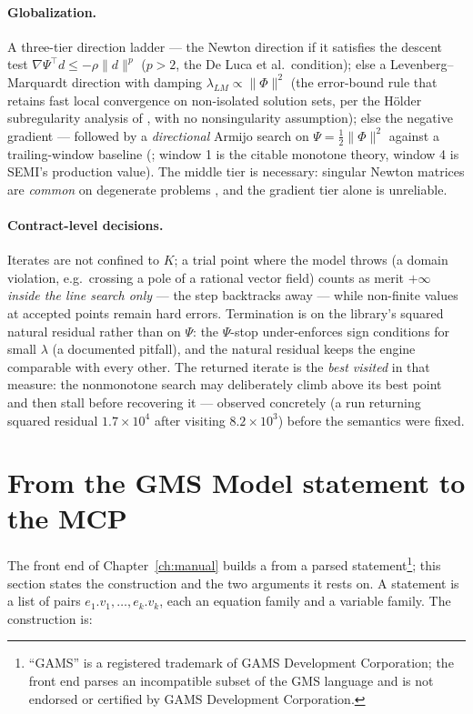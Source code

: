 \paragraph{Globalization.} A three-tier direction ladder --- the Newton
direction if it satisfies the descent test
$\nabla\Psi^\top d \le -\rho\|d\|^{p}$ ($p > 2$, the De Luca et al.\
condition); else a Levenberg--Marquardt direction with damping
$\lambda_{LM} \propto \|\Phi\|^2$ (the error-bound rule that retains fast
local convergence on non-isolated solution sets, per the H\"older
subregularity analysis of \cite{ahookhosh2019}, with no nonsingularity
assumption); else the negative gradient --- followed by a
\emph{directional} Armijo search on $\Psi = \tfrac12\|\Phi\|^2$ against a
trailing-window baseline (\code{nonmonotoneMemory}; window 1 is the citable
monotone theory, window 4 is SEMI's production value). The middle tier is
necessary: singular Newton matrices are \emph{common} on degenerate
problems \cite{munson2001}, and the gradient tier alone is unreliable.

\paragraph{Contract-level decisions.} Iterates are not confined to $K$;
a trial point where the model throws (a domain violation, e.g.\ crossing a
pole of a rational vector field) counts as merit $+\infty$ \emph{inside
the line search only} --- the step backtracks away --- while non-finite
values at accepted points remain hard errors. Termination is on the
library's squared natural residual rather than on $\Psi$: the
$\Psi$-stop under-enforces sign conditions for small $\lambda$ (a
documented pitfall), and the natural residual keeps the engine comparable
with every other. The returned iterate is the \emph{best visited} in that
measure: the nonmonotone search may deliberately climb above its best point
and then stall before recovering it --- observed concretely (a run
returning squared residual $1.7\times 10^{4}$ after visiting
$8.2\times 10^{3}$) before the semantics were fixed.

\section{From the GMS Model statement to the MCP}
\label{sec:a-gmsmcp}

The front end of Chapter~\ref{ch:manual} builds a  from a
parsed \code{Model} statement\footnote{``GAMS'' is a registered trademark
of GAMS Development Corporation; the front end parses an incompatible
subset of the GMS language and is not endorsed or certified by GAMS
Development Corporation.}; this section states the construction and the
two arguments it rests on. A \code{Model} statement is a list of pairs
$e_1.v_1, \ldots, e_k.v_k$, each an equation family and a variable
family. The construction is:

